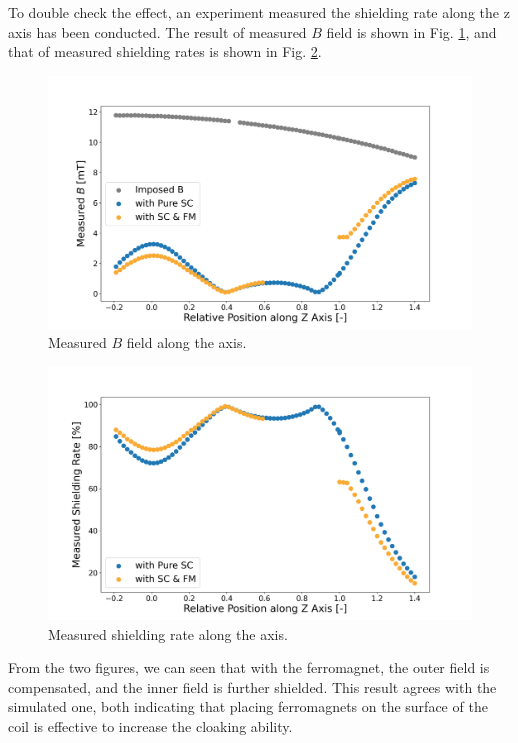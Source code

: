 To double check the effect,
an experiment measured the shielding rate along the z axis has been conducted.
The result of measured $B$ field is shown in Fig. \ref{fig:expFMMeasuredBs},
and that of measured shielding rates is shown in Fig. \ref{fig:expFMMeasuredShieldingRates}.
\begin{figure}[H]
  \includegraphics[width=18cm, bb=9 9 900 550]{./section3Effectiveness/comparedB.png}
  \caption{Measured $B$ field along the axis.}
  \label{fig:expFMMeasuredBs}
\end{figure}
\begin{figure}[H]
  \includegraphics[width=18cm, bb=9 9 900 550]{./section3Effectiveness/comparedShieldingRate.png}
  \caption{Measured shielding rate along the axis.}
  \label{fig:expFMMeasuredShieldingRates}
\end{figure}
From the two figures,
we can seen that with the ferromagnet, the outer field is compensated, and the inner field is further shielded.
This result agrees with the simulated one,
both indicating that placing ferromagnets on the surface of the coil is effective to increase the cloaking ability.


